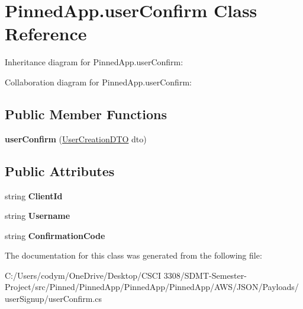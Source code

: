 \hypertarget{class_pinned_app_1_1user_confirm}{}\section{Pinned\+App.\+user\+Confirm Class Reference}
\label{class_pinned_app_1_1user_confirm}


Inheritance diagram for Pinned\+App.\+user\+Confirm\+:


Collaboration diagram for Pinned\+App.\+user\+Confirm\+:
\subsection*{Public Member Functions}
\begin{DoxyCompactItemize}
\item 
\mbox{\label{class_pinned_app_1_1user_confirm_a974402220e90cc0dca967f0b016772ee}} 
{\bfseries user\+Confirm} (\hyperlink{class_pinned_app_1_1_user_creation_d_t_o}{User\+Creation\+D\+TO} dto)
\end{DoxyCompactItemize}
\subsection*{Public Attributes}
\begin{DoxyCompactItemize}
\item 
\mbox{\label{class_pinned_app_1_1user_confirm_a87b943a7898c4c62b002c11b9f42e5ac}} 
string {\bfseries Client\+Id}
\item 
\mbox{\label{class_pinned_app_1_1user_confirm_a5cba1dda761857fca38d2a22a08ff656}} 
string {\bfseries Username}
\item 
\mbox{\label{class_pinned_app_1_1user_confirm_ad2aa38e4f83ced982da10836927589ca}} 
string {\bfseries Confirmation\+Code}
\end{DoxyCompactItemize}


The documentation for this class was generated from the following file\+:\begin{DoxyCompactItemize}
\item 
C\+:/\+Users/codym/\+One\+Drive/\+Desktop/\+C\+S\+C\+I 3308/\+S\+D\+M\+T-\/\+Semester-\/\+Project/src/\+Pinned/\+Pinned\+App/\+Pinned\+App/\+Pinned\+App/\+A\+W\+S/\+J\+S\+O\+N/\+Payloads/user\+Signup/user\+Confirm.\+cs\end{DoxyCompactItemize}

